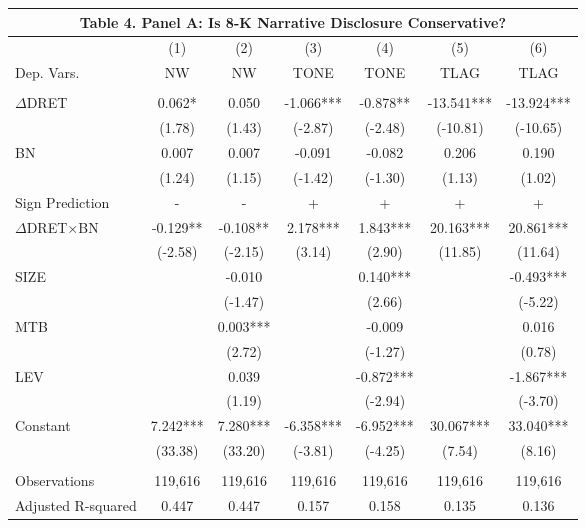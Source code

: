 \begin{table}[H]	\label{T4PA}%
	\centering
	\begin{tabular}{lcccccc}
		\multicolumn{7}{c}{\textbf{Table 4. Panel A: Is 8-K Narrative Disclosure Conservative?}} \\
		\midrule
		\midrule
		& (1) & (2) & (3) & (4) & (5) & (6) \\
		Dep. Vars. & NW & NW & TONE & TONE & TLAG & TLAG \\
		\midrule
		&   &   &   &   &   &  \\
		$\Delta$DRET & 0.062* & 0.050 & -1.066*** & -0.878** & -13.541*** & -13.924*** \\
		& (1.78) & (1.43) & (-2.87) & (-2.48) & (-10.81) & (-10.65) \\
		BN & 0.007 & 0.007 & -0.091 & -0.082 & 0.206 & 0.190 \\
		& (1.24) & (1.15) & (-1.42) & (-1.30) & (1.13) & (1.02) \\
		\rowcolor[rgb]{ .933,  .925,  .882} Sign Prediction & - & - & + & + & + & + \\
		\rowcolor[rgb]{ .933,  .925,  .882} $\Delta$DRET$\times$BN & -0.129** & -0.108** & 2.178*** & 1.843*** & 20.163*** & 20.861*** \\
		\rowcolor[rgb]{ .933,  .925,  .882}   & (-2.58) & (-2.15) & (3.14) & (2.90) & (11.85) & (11.64) \\
		SIZE &   & -0.010 &   & 0.140*** &   & -0.493*** \\
		&   & (-1.47) &   & (2.66) &   & (-5.22) \\
		MTB &   & 0.003*** &   & -0.009 &   & 0.016 \\
		&   & (2.72) &   & (-1.27) &   & (0.78) \\
		LEV &   & 0.039 &   & -0.872*** &   & -1.867*** \\
		&   & (1.19) &   & (-2.94) &   & (-3.70) \\
		Constant & 7.242*** & 7.280*** & -6.358*** & -6.952*** & 30.067*** & 33.040*** \\
		& (33.38) & (33.20) & (-3.81) & (-4.25) & (7.54) & (8.16) \\
		&   &   &   &   &   &  \\
		Observations & 119,616 & 119,616 & 119,616 & 119,616 & 119,616 & 119,616 \\
		Adjusted R-squared & 0.447 & 0.447 & 0.157 & 0.158 & 0.135 & 0.136 \\
		\bottomrule
		\bottomrule
	\end{tabular}%
\end{table}%
